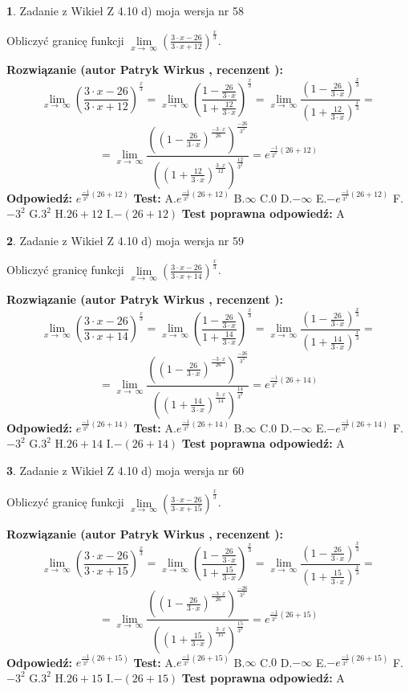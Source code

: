 \documentclass[12pt, a4paper]{article}
\theoremstyle{definition} %
\newtheorem{zad}{}
\newcommand{\zadStart}[1]{\begin{zad}#1\newline}
\newcommand{\zadStop}{\end{zad}}
\newcommand{\rozwStart}[2]{\noindent \textbf{Rozwiązanie (autor #1 , recenzent #2): }\newline}
\newcommand{\rozwStop}{\newline}
\newcommand{\odpStart}{\noindent \textbf{Odpowiedź:}\newline}
\newcommand{\odpStop}{\newline}
\newcommand{\testStart}{\noindent \textbf{Test:}\newline}
\newcommand{\testStop}{\newline}
\newcommand{\kluczStart}{\noindent \textbf{Test poprawna odpowiedź:}\newline}
\newcommand{\kluczStop}{\newline}
\begin{document}
\zadStart{Zadanie z Wikieł Z 4.10 d) moja wersja nr 58}


Obliczyć granicę funkcji  $\lim\limits_{x\to\ \infty}(\frac{3\cdot x-26}{3\cdot x+12})^{\frac{x}{3}}$.
\zadStop
\rozwStart{Patryk Wirkus}{}
$$\lim\limits_{x\to\ \infty}(\frac{3\cdot x-26}{3\cdot x+12})^{\frac{x}{3}} = \lim\limits_{x\to\ \infty}(\frac{1-\frac{26}{3\cdot x}}{1+\frac{12}{3\cdot x}})^{\frac{x}{3}}=\lim\limits_{x\to\ \infty}\frac{(1-\frac{26}{3\cdot x})^{\frac{x}{3}}}{(1+\frac{12}{3\cdot x})^{\frac{x}{3}}}=$$
$$=\lim\limits_{x\to\ \infty}\frac{((1-\frac{26}{3\cdot x})^{\frac{-3\cdot x}{26}})^{\frac{-26}{3^{2}}}}{((1+\frac{12}{3\cdot x})^{\frac{3\cdot x}{12}})^{\frac{12}{3^{2}}}}=e^{\frac{-1}{3^{2}}(26+12)}$$
\rozwStop
\odpStart
$e^{\frac{-1}{3^{2}}(26+12)}$
\odpStop
\testStart
A.$e^{\frac{-1}{3^{2}}(26+12)}$ B.$\infty$ C.$0$ D.$-\infty$ E.$-e^{\frac{-1}{3^{2}}(26+12)}$
F.$-3^{2}$ G.$3^{2}$
H.$26+12$
I.$-(26+12)$
\testStop
\kluczStart
A
\kluczStop



\zadStart{Zadanie z Wikieł Z 4.10 d) moja wersja nr 59}


Obliczyć granicę funkcji  $\lim\limits_{x\to\ \infty}(\frac{3\cdot x-26}{3\cdot x+14})^{\frac{x}{3}}$.
\zadStop
\rozwStart{Patryk Wirkus}{}
$$\lim\limits_{x\to\ \infty}(\frac{3\cdot x-26}{3\cdot x+14})^{\frac{x}{3}} = \lim\limits_{x\to\ \infty}(\frac{1-\frac{26}{3\cdot x}}{1+\frac{14}{3\cdot x}})^{\frac{x}{3}}=\lim\limits_{x\to\ \infty}\frac{(1-\frac{26}{3\cdot x})^{\frac{x}{3}}}{(1+\frac{14}{3\cdot x})^{\frac{x}{3}}}=$$
$$=\lim\limits_{x\to\ \infty}\frac{((1-\frac{26}{3\cdot x})^{\frac{-3\cdot x}{26}})^{\frac{-26}{3^{2}}}}{((1+\frac{14}{3\cdot x})^{\frac{3\cdot x}{14}})^{\frac{14}{3^{2}}}}=e^{\frac{-1}{3^{2}}(26+14)}$$
\rozwStop
\odpStart
$e^{\frac{-1}{3^{2}}(26+14)}$
\odpStop
\testStart
A.$e^{\frac{-1}{3^{2}}(26+14)}$ B.$\infty$ C.$0$ D.$-\infty$ E.$-e^{\frac{-1}{3^{2}}(26+14)}$
F.$-3^{2}$ G.$3^{2}$
H.$26+14$
I.$-(26+14)$
\testStop
\kluczStart
A
\kluczStop



\zadStart{Zadanie z Wikieł Z 4.10 d) moja wersja nr 60}


Obliczyć granicę funkcji  $\lim\limits_{x\to\ \infty}(\frac{3\cdot x-26}{3\cdot x+15})^{\frac{x}{3}}$.
\zadStop
\rozwStart{Patryk Wirkus}{}
$$\lim\limits_{x\to\ \infty}(\frac{3\cdot x-26}{3\cdot x+15})^{\frac{x}{3}} = \lim\limits_{x\to\ \infty}(\frac{1-\frac{26}{3\cdot x}}{1+\frac{15}{3\cdot x}})^{\frac{x}{3}}=\lim\limits_{x\to\ \infty}\frac{(1-\frac{26}{3\cdot x})^{\frac{x}{3}}}{(1+\frac{15}{3\cdot x})^{\frac{x}{3}}}=$$
$$=\lim\limits_{x\to\ \infty}\frac{((1-\frac{26}{3\cdot x})^{\frac{-3\cdot x}{26}})^{\frac{-26}{3^{2}}}}{((1+\frac{15}{3\cdot x})^{\frac{3\cdot x}{15}})^{\frac{15}{3^{2}}}}=e^{\frac{-1}{3^{2}}(26+15)}$$
\rozwStop
\odpStart
$e^{\frac{-1}{3^{2}}(26+15)}$
\odpStop
\testStart
A.$e^{\frac{-1}{3^{2}}(26+15)}$ B.$\infty$ C.$0$ D.$-\infty$ E.$-e^{\frac{-1}{3^{2}}(26+15)}$
F.$-3^{2}$ G.$3^{2}$
H.$26+15$
I.$-(26+15)$
\testStop
\kluczStart
A
\kluczStop
\end{document}
